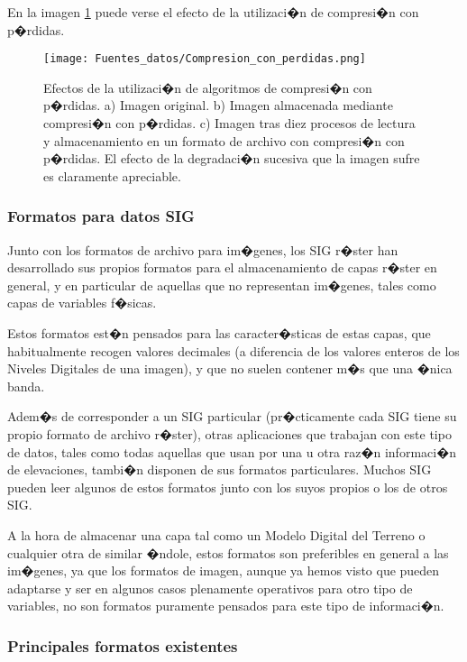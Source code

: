 En la imagen \ref{Fig:Compresion_con_perdidas} puede verse el efecto de la utilizaci�n de compresi�n con p�rdidas.

\begin{figure}
\centering
\texttt{[image: Fuentes\_datos/Compresion\_con\_perdidas.png]}
\caption{\small Efectos de la utilizaci�n de algoritmos de compresi�n con p�rdidas. a) Imagen original. b) Imagen almacenada mediante compresi�n con p�rdidas. c) Imagen tras diez procesos de lectura y almacenamiento en un formato de archivo con compresi�n con p�rdidas. El efecto de la degradaci�n sucesiva que la imagen sufre es claramente apreciable.}
\label{Fig:Compresion_con_perdidas} 
\end{figure}

\subsubsection{Formatos para datos SIG}

Junto con los formatos de archivo para im�genes, los SIG r�ster han desarrollado sus propios formatos para el almacenamiento de capas r�ster en general, y en particular de aquellas que no representan im�genes, tales como capas de variables f�sicas.

Estos formatos est�n pensados para las caracter�sticas de estas capas, que habitualmente recogen valores decimales (a diferencia de los valores enteros de los Niveles Digitales de una imagen), y que no suelen contener m�s que una �nica banda.

Adem�s de corresponder a un SIG particular (pr�cticamente cada SIG tiene su propio formato de archivo r�ster), otras aplicaciones que trabajan con este tipo de datos, tales como todas aquellas que usan por una u otra raz�n informaci�n de elevaciones, tambi�n disponen de sus formatos particulares. Muchos SIG pueden leer algunos de estos formatos junto con los suyos propios o los de otros SIG.

A la hora de almacenar una capa tal como un Modelo Digital del Terreno o cualquier otra de similar �ndole, estos formatos son preferibles en general a las im�genes, ya que los formatos de imagen, aunque ya hemos visto que pueden adaptarse y ser en algunos casos plenamente operativos para otro tipo de variables, no son formatos puramente pensados para este tipo de informaci�n.

\subsubsection{Principales formatos existentes}

